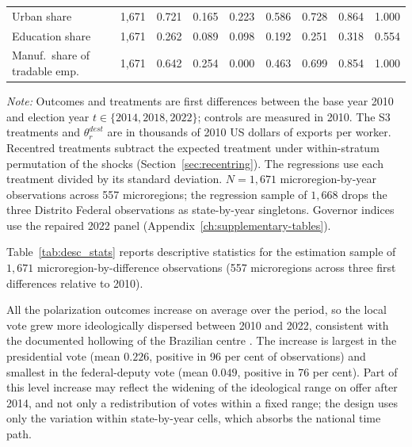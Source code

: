 \documentclass[
	11pt,				%
	oneside,			%
	a4paper,			%
	english,			%
	english				%
	]{abntex2ppgsi}
\theoremstyle{plain}
\theoremstyle{remark}
\theoremstyle{plain}%
\theoremstyle{remark}%
\begin{document}
\begin{table}[!htbp]
\begin{threeparttable}
\begin{tabular*}{\textwidth}{@{\extracolsep{\fill}}lrrrrrrrr@{}}
Urban share                    & 1,671 & 0.721  & 0.165 & 0.223  & 0.586  & 0.728  & 0.864  & 1.000 \\
Education share                & 1,671 & 0.262  & 0.089 & 0.098  & 0.192  & 0.251  & 0.318  & 0.554 \\
Manuf.\ share of tradable emp. & 1,671 & 0.642  & 0.254 & 0.000  & 0.463  & 0.699  & 0.854  & 1.000 \\
\bottomrule
\end{tabular*}
\begin{tablenotes}[flushleft]
\footnotesize
\item \textit{Note:} Outcomes and treatments are first differences between the base year 2010 and election year $t\in\{2014,2018,2022\}$; controls are measured in 2010. The S3 treatments and $\theta^{dest}_r$ are in thousands of 2010 US dollars of exports per worker. Recentred treatments subtract the expected treatment under within-stratum permutation of the shocks (Section~\ref{sec:recentring}). The regressions use each treatment divided by its standard deviation. $N=1{,}671$ microregion-by-year observations across 557 microregions; the regression sample of $1{,}668$ drops the three Distrito Federal observations as state-by-year singletons. Governor indices use the repaired 2022 panel (Appendix~\ref{ch:supplementary-tables}).
\end{tablenotes}
\end{threeparttable}
\end{table}

Table~\ref{tab:desc_stats} reports descriptive statistics for the estimation sample of $1{,}671$ microregion-by-difference observations (557 microregions across three first differences relative to 2010).

All the polarization outcomes increase on average over the period, so the local vote grew more ideologically dispersed between 2010 and 2022, consistent with the documented hollowing of the Brazilian centre \cite{ZUCCO}. The increase is largest in the presidential vote (mean $0.226$, positive in 96 per cent of observations) and smallest in the federal-deputy vote (mean $0.049$, positive in 76 per cent). Part of this level increase may reflect the widening of the ideological range on offer after 2014, and not only a redistribution of votes within a fixed range; the design uses only the variation within state-by-year cells, which absorbs the national time path.
\end{document}
